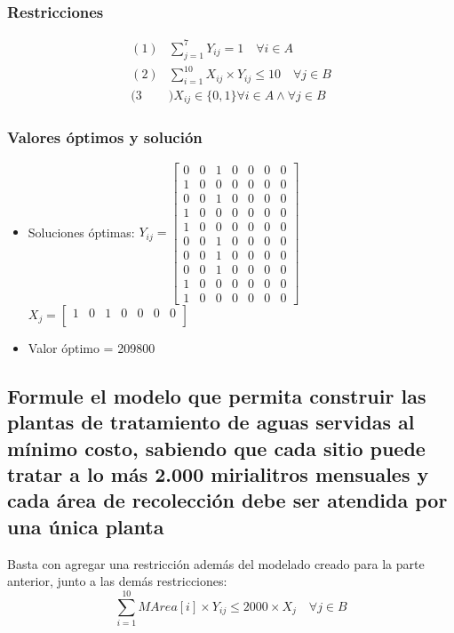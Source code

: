 \documentclass[a4paper,12pt]{article}
\begin{document}
\subsubsection{Restricciones}
\begin{equation*}
	\begin{split}
		(1)&\sum_{j=1}^{7}Y_{ij}=1\quad \forall i\in A\\
		(2)&\sum_{i=1}^{10}X_{ij}\times Y_{ij}\leq 10\quad \forall j\in B\\
		(3&)X_{ij}\in\{0,1\}\forall i\in A \wedge \forall j\in B
	\end{split}
\end{equation*}
\subsubsection{Valores óptimos y solución}
\begin{itemize}
	\item Soluciones óptimas: $Y_{ij}=
	\begin{bmatrix}
	0 & 0 & 1 & 0 & 0 & 0 & 0\\
	1 & 0 & 0 & 0 & 0 & 0 & 0\\
	0 & 0 & 1 & 0 & 0 & 0 & 0\\
	1 & 0 & 0 & 0 & 0 & 0 & 0\\
	1 & 0 & 0 & 0 & 0 & 0 & 0\\
	0 & 0 & 1 & 0 & 0 & 0 & 0\\
	0 & 0 & 1 & 0 & 0 & 0 & 0\\
	0 & 0 & 1 & 0 & 0 & 0 & 0\\
	1 & 0 & 0 & 0 & 0 & 0 & 0\\
	1 & 0 & 0 & 0 & 0 & 0 & 0
	\end{bmatrix}$\\
	
	$X_{j}=
	\begin{bmatrix}
	1 & 0 & 1 & 0 & 0 & 0 & 0\\
	\end{bmatrix}$
	\item Valor óptimo = 209800
\end{itemize}
\subsection{Formule  el  modelo  que  permita  construir  las  plantas  de  tratamiento  de  aguas  servidas  al  mínimo  costo, sabiendo que cada sitio puede  tratar a lo más 2.000 mirialitros mensuales y cada área de recolección debe ser atendida por una única planta}
Basta con agregar una restricción además del modelado creado para la parte anterior, junto a las demás restricciones:
\begin{equation*}
	\sum_{i=1}^{10}MArea[i]\times Y_{ij}\leq 2000\times X_j \quad \forall j \in B
\end{equation*}
\end{document}
